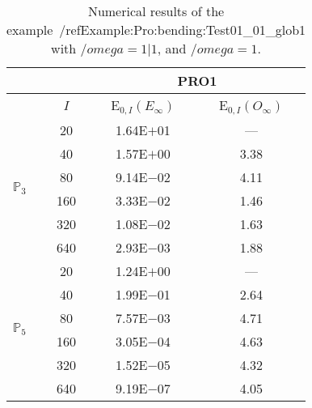 \begin{table}[H]
\caption{Numerical results of the example~/ref{Example:Pro:bending:Test01_01_glob1} with $/omega=1|1$, and $/omega=1$.}
\setlength{\tabcolsep}{5pt}
\centering
\begin{tabular}{@{}l c c c@{}}
\toprule
 &  & \multicolumn{2}{c}{PRO1}\\
\midrule
 & $I$ & E$_{0,I}(E_{\infty})$ & E$_{0,I}(O_{\infty})$\\
\midrule
\multirow{6}{*}{$\mathbb{P}_{3}$}
 & 20 & 1.64E$+$01 & ---\\
 & 40 & 1.57E$+$00 & 3.38\\
 & 80 & 9.14E$-$02 & 4.11\\
 & 160 & 3.33E$-$02 & 1.46\\
 & 320 & 1.08E$-$02 & 1.63\\
 & 640 & 2.93E$-$03 & 1.88\\
\midrule
\multirow{6}{*}{$\mathbb{P}_{5}$}
 & 20 & 1.24E$+$00 & ---\\
 & 40 & 1.99E$-$01 & 2.64\\
 & 80 & 7.57E$-$03 & 4.71\\
 & 160 & 3.05E$-$04 & 4.63\\
 & 320 & 1.52E$-$05 & 4.32\\
 & 640 & 9.19E$-$07 & 4.05\\
\bottomrule
\end{tabular}
\label{Table:PRO:test_01_01_test26_pro1}
\end{table}
